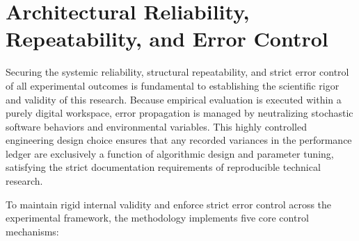 \section{Architectural Reliability, Repeatability, and Error Control}

Securing the systemic reliability, structural repeatability, and strict error control of all
experimental outcomes is fundamental to establishing the scientific rigor and validity of this
research. Because empirical evaluation is executed within a purely digital workspace, error
propagation is managed by neutralizing stochastic software behaviors and environmental variables.
This highly controlled engineering design choice ensures that any recorded variances in the
performance ledger are exclusively a function of algorithmic design and parameter tuning, satisfying
the strict documentation requirements of reproducible technical research.

To maintain rigid internal validity and enforce strict error control across the experimental
framework, the methodology implements five core control mechanisms:

